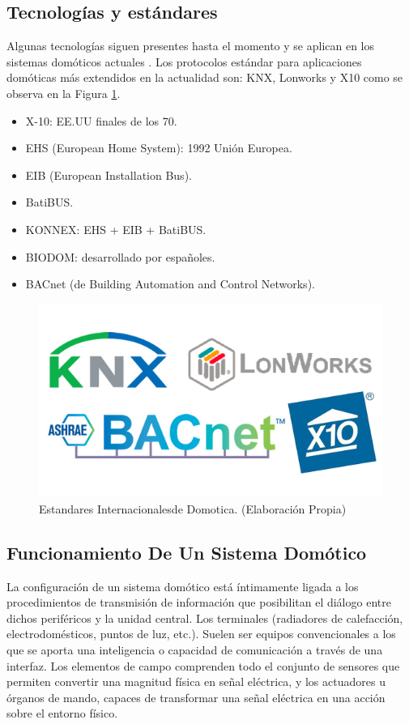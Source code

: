 \documentclass[11pt,letterpaper]{report}
\begin{document}
		\subsection{Tecnologías y estándares}
		Algunas tecnologías siguen presentes hasta el momento y se aplican en los sistemas domóticos actuales \citep{herrera2005}. Los protocolos estándar para aplicaciones domóticas más extendidos en la actualidad son: KNX, Lonworks y X10 como se observa en la  Figura \ref{estandaresDomoticos}.
		\begin{itemize}
		\item X-10: EE.UU finales de los 70.
		\item EHS (European Home System): 1992 Unión Europea.
		\item EIB (European Installation Bus).
		\item BatiBUS.
		\item KONNEX: EHS + EIB + BatiBUS.
		\item BIODOM: desarrollado por españoles.
		\item BACnet (de Building Automation and Control Networks).
		\end{itemize}
		\begin{figure}[h]
		\centering
		\includegraphics[scale=0.7]{imagenes/estandares_internacionales_de_domotica2.png}
		\caption{Estandares Internacionalesde Domotica. (Elaboración Propia)}
		\label{estandaresDomoticos} 
		\end{figure}
		\subsection{Funcionamiento De Un Sistema Domótico}
		La configuración de un sistema domótico está íntimamente ligada a los procedimientos de transmisión de información que posibilitan el diálogo entre dichos periféricos y la unidad central. Los terminales (radiadores de calefacción, electrodomésticos, puntos de luz, etc.). Suelen ser equipos convencionales a los que se aporta una inteligencia o capacidad de comunicación a través de una interfaz. Los elementos de campo comprenden todo el conjunto de sensores que permiten convertir una magnitud física en señal eléctrica, y los actuadores u órganos de mando, capaces de transformar una señal eléctrica en una acción sobre el entorno físico.
		
\end{document}
